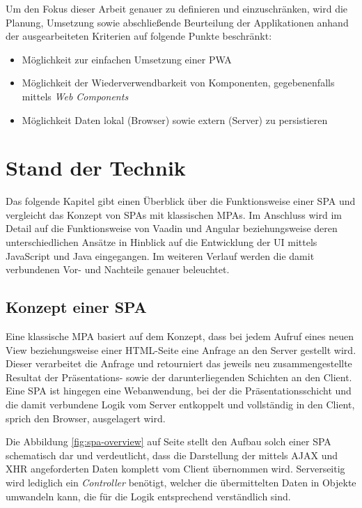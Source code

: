 \documentclass[a4paper,12pt,twoside]{scrreprt}
\begin{document}
\medskip

Um den Fokus dieser Arbeit genauer zu definieren und einzuschränken, wird die Planung, Umsetzung sowie abschließende Beurteilung der Applikationen anhand der ausgearbeiteten Kriterien auf folgende Punkte beschränkt:
\begin{itemize}
    \item Möglichkeit zur einfachen Umsetzung einer \acf{PWA}
    \item Möglichkeit der Wiederverwendbarkeit von Komponenten, gegebenenfalls mittels \textit{Web Components}
    \item Möglichkeit Daten lokal (Browser) sowie extern (Server) zu persistieren
\end{itemize}

\chapter{Stand der Technik}
\label{chap:stand-technik}
Das folgende Kapitel gibt einen Überblick über die Funktionsweise einer \ac{SPA} und vergleicht das Konzept von \acsp{SPA} mit klassischen \acp{MPA}. Im Anschluss wird im Detail auf die Funktionsweise von Vaadin und Angular beziehungsweise deren unterschiedlichen Ansätze in Hinblick auf die Entwicklung der \acs{UI} mittels JavaScript und Java eingegangen. Im weiteren Verlauf werden die damit verbundenen Vor- und Nachteile genauer beleuchtet.

\section{Konzept einer \acs{SPA}}
\label{sec:konzept-spa}
Eine klassische \ac{MPA} basiert auf dem Konzept, dass bei jedem Aufruf eines neuen View beziehungsweise einer HTML-Seite eine Anfrage an den Server gestellt wird. Dieser verarbeitet die Anfrage und retourniert das jeweils neu zusammengestellte Resultat der Präsentations- sowie der darunterliegenden Schichten an den Client. Eine \ac{SPA} ist hingegen eine Webanwendung, bei der die Präsentationsschicht und die damit verbundene Logik vom Server entkoppelt und vollständig in den Client, sprich den Browser, ausgelagert wird. \parencite[][Seite 5ff.]{scott_spa_2015}

Die Abbildung \ref{fig:spa-overview} auf Seite \pageref{fig:spa-overview} stellt den Aufbau solch einer \ac{SPA} schematisch dar und verdeutlicht, dass die Darstellung der mittels \acs{AJAX} und XHR angeforderten Daten komplett vom Client übernommen wird. Serverseitig wird lediglich ein \textit{Controller} benötigt, welcher die übermittelten Daten in Objekte umwandeln kann, die für die Logik entsprechend verständlich sind.
\end{document}

